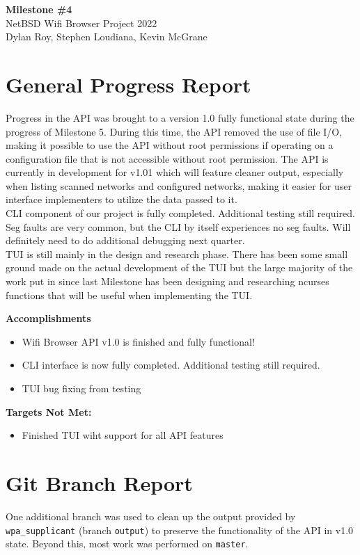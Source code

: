 \documentclass[11pt]{article}
\begin{document}
\begin{center}
  \textbf{\Large Milestone \#4}\\\large NetBSD Wifi Browser Project 2022\\
  Dylan Roy, Stephen Loudiana, Kevin McGrane
\end{center}


\section{General Progress Report}
Progress in the API was brought to a version 1.0 fully functional state during
the progress of Milestone 5. During this time, the API removed the use of file
I/O, making it possible to use the API without root permissions if operating on
a configuration file that is not accessible without root permission. The API is
currently in development for v1.01 which will feature cleaner output, especially
when listing scanned networks and configured networks, making it easier for user
interface implementers to utilize the data passed to it.\\
CLI component of our project is fully completed. Additional testing still 
required. Seg faults are very common, but the CLI by itself experiences no seg 
faults. Will definitely need to do additional debugging next quarter. \\
TUI is still mainly in the design and research phase. There has been some small
ground made on the actual development of the TUI but the large majority of the
work put in since last Milestone has been designing and researching ncurses functions 
that will be useful when implementing the TUI.

\textbf{Accomplishments}
\begin{itemize}
  \item Wifi Browser API v1.0 is finished and fully functional!
  \item CLI interface is now fully completed. Additional testing still required. 
  \item TUI bug fixing from testing
\end{itemize}

\textbf{Targets Not Met:}
\begin{itemize}
  \item Finished TUI wiht support for all API features
\end{itemize}


\section{Git Branch Report}
One additional branch was used to clean up the output provided by \texttt{wpa\_supplicant}
(branch \texttt{output}) to preserve the functionality of the API in v1.0 state.
Beyond this, most work was performed on \texttt{master}.
\end{document}
